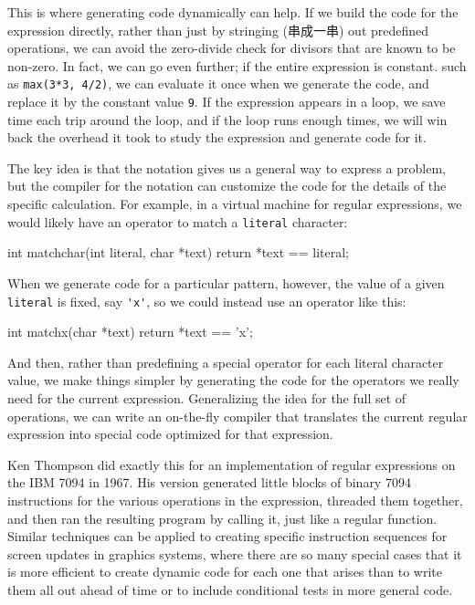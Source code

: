 This is where generating code dynamically can help. If we build the code
for the expression directly, rather than just by stringing (串成一串) out
predefined operations, we can avoid the zero-divide check for divisors that
are known to be non-zero. In fact, we can go even further; if the entire
expression is constant. such as \verb'max(3*3, 4/2)', we can evaluate it
once when we generate the code, and replace it by the constant value
\verb'9'.  If the expression appears in a loop, we save time each trip
around the loop, and if the loop runs enough times, we will win back the
overhead it took to study the expression and generate code for it.

The key idea is that the notation gives us a general way to express a
problem, but the compiler for the notation can customize the code for the
details of the specific calculation. For example, in a virtual machine for
regular expressions, we would likely have an operator to match a
\verb'literal' character:
\begin{wellcode}
    int matchchar(int literal, char *text)
    {
        return *text == literal;
    }
\end{wellcode}
When we generate code for a particular pattern, however, the value of a
given \verb'literal' is fixed, say \verb"'x'", so we could instead use an
operator like this:
\begin{wellcode}
    int matchx(char *text)
    {
        return *text == 'x';
    }
\end{wellcode}
And then, rather than predefining a special operator for each literal
character value, we make things simpler by generating the code for the
operators we really need for the current expression. Generalizing the idea
for the full set of operations, we can write an on-the-fly compiler that
translates the current regular expression into special code optimized for
that expression.

Ken Thompson did exactly this for an implementation of regular expressions
on the IBM 7094 in 1967. His version generated little blocks of binary 7094
instructions for the various operations in the expression, threaded them
together, and then ran the resulting program by calling it, just like a
regular function. Similar techniques can be applied to creating specific
instruction sequences for screen updates in graphics systems, where there
are so many special cases that it is more efficient to create dynamic code
for each one that arises than to write them all out ahead of time or to
include conditional tests in more general code.

